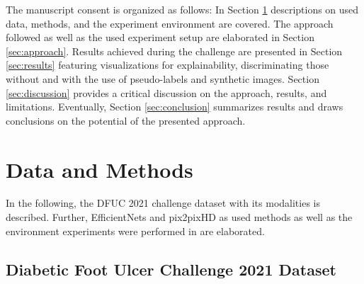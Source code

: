 \documentclass[runningheads]{llncs}
\begin{document}
The manuscript consent is organized as follows: In Section \ref{sec:data_and_methods} descriptions on used data, methods, and the experiment environment are covered. The approach followed as well as the used experiment setup are elaborated in Section \ref{sec:approach}. Results achieved during the challenge are presented in Section \ref{sec:results} featuring visualizations for explainability, discriminating those without and with the use of pseudo-labels and synthetic images. Section \ref{sec:discussion} provides a critical discussion on the approach, results, and limitations. Eventually, Section \ref{sec:conclusion} summarizes results and draws conclusions on the potential of the presented approach.


\section{Data and Methods}
\label{sec:data_and_methods}

In the following, the DFUC 2021 challenge dataset with its modalities is described. Further,  EfficientNets and pix2pixHD as used methods as well as the environment experiments were performed in are elaborated.



\subsection{Diabetic Foot Ulcer Challenge 2021 Dataset} %
\end{document}
